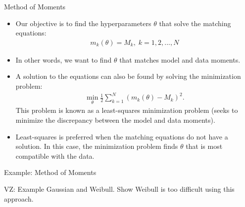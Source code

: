 \documentclass[9pt]{beamer}
\begin{document}
\begin{frame}{Method of Moments}

\begin{itemize}

\item Our objective is to find the hyperparameters $\theta$ that solve the matching equations:
\begin{align*}
m_k(\theta)=M_k,\; k=1,2,...,N
\end{align*}
\item In other words, we want to find $\theta$ that matches model and data moments. 

\item A solution to the equations can also be found by solving the minimization problem:
\begin{align*}
\min_\theta \frac{1}{2}\sum_{k=1}^N(m_k(\theta)-M_k)^2.
\end{align*}
This problem is known as a least-squares minimization problem (seeks to minimize the discrepancy between the model and data moments). 

\item Least-squares is preferred when the matching equations do not have a solution. In this case, the minimization problem finds $\theta$ that is most compatible with the data.  

\end{itemize}

\end{frame}


%
\begin{frame}{Example: Method of Moments}

\begin{block}{}
{\color{red} VZ: Example Gaussian and Weibull. Show Weibull is too difficult using this approach.}
\end{block}

\end{frame}
\end{document}
